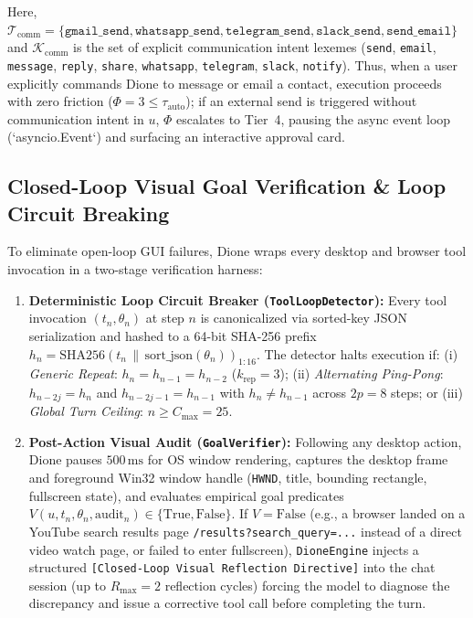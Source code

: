 \documentclass[10pt,a4paper]{article}
\begin{document}
Here, $\mathcal{T}_{\text{comm}} = \{\texttt{gmail\_send}, \texttt{whatsapp\_send}, \texttt{telegram\_send}, \texttt{slack\_send}, \texttt{send\_email}\}$ and $\mathcal{K}_{\text{comm}}$ is the set of explicit communication intent lexemes (\texttt{send}, \texttt{email}, \texttt{message}, \texttt{reply}, \texttt{share}, \texttt{whatsapp}, \texttt{telegram}, \texttt{slack}, \texttt{notify}). Thus, when a user explicitly commands Dione to message or email a contact, execution proceeds with zero friction ($\Phi = 3 \le \tau_{\text{auto}}$); if an external send is triggered without communication intent in $u$, $\Phi$ escalates to Tier~4, pausing the async event loop (`asyncio.Event`) and surfacing an interactive approval card.

\subsection{Closed-Loop Visual Goal Verification \& Loop Circuit Breaking}
To eliminate open-loop GUI failures, Dione wraps every desktop and browser tool invocation in a two-stage verification harness:
\begin{enumerate}\setlength{\itemsep}{2pt}\setlength{\parskip}{0pt}
    \item \textbf{Deterministic Loop Circuit Breaker (\texttt{ToolLoopDetector}):} Every tool invocation $(t_n, \theta_n)$ at step $n$ is canonicalized via sorted-key JSON serialization and hashed to a 64-bit SHA-256 prefix $h_n = \text{SHA256}(t_n \,\|\, \text{sort\_json}(\theta_n))_{1:16}$. The detector halts execution if: (i) \textit{Generic Repeat}: $h_n = h_{n-1} = h_{n-2}$ ($k_{\text{rep}} = 3$); (ii) \textit{Alternating Ping-Pong}: $h_{n-2j} = h_n$ and $h_{n-2j-1} = h_{n-1}$ with $h_n \neq h_{n-1}$ across $2p = 8$ steps; or (iii) \textit{Global Turn Ceiling}: $n \ge C_{\max} = 25$.
    \item \textbf{Post-Action Visual Audit (\texttt{GoalVerifier}):} Following any desktop action, Dione pauses $500\,\text{ms}$ for OS window rendering, captures the desktop frame and foreground Win32 window handle (\texttt{HWND}, title, bounding rectangle, fullscreen state), and evaluates empirical goal predicates $V(u, t_n, \theta_n, \text{audit}_n) \in \{\text{True}, \text{False}\}$. If $V = \text{False}$ (e.g., a browser landed on a YouTube search results page \texttt{/results?search\_query=...} instead of a direct video watch page, or failed to enter fullscreen), \texttt{DioneEngine} injects a structured \texttt{[Closed-Loop Visual Reflection Directive]} into the chat session (up to $R_{\max}=2$ reflection cycles) forcing the model to diagnose the discrepancy and issue a corrective tool call before completing the turn.
\end{enumerate}
\end{document}
